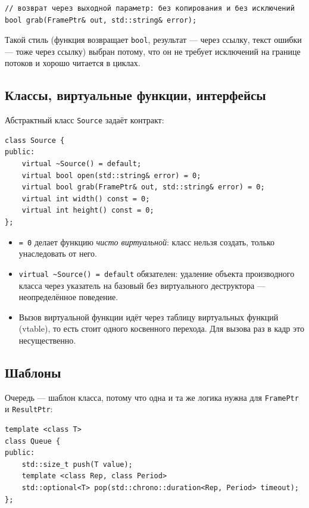 \documentclass[11pt,a4paper]{article}
\theoremstyle{definition}
\theoremstyle{remark}
\begin{document}
\begin{lstlisting}
// возврат через выходной параметр: без копирования и без исключений
bool grab(FramePtr& out, std::string& error);
\end{lstlisting}

Такой стиль (функция возвращает \texttt{bool}, результат --- через ссылку,
текст ошибки --- тоже через ссылку) выбран потому, что он не требует
исключений на границе потоков и хорошо читается в циклах.

\subsection{Классы, виртуальные функции, интерфейсы}

Абстрактный класс \texttt{Source} задаёт контракт:

\begin{lstlisting}
class Source {
public:
    virtual ~Source() = default;
    virtual bool open(std::string& error) = 0;
    virtual bool grab(FramePtr& out, std::string& error) = 0;
    virtual int width() const = 0;
    virtual int height() const = 0;
};
\end{lstlisting}

\begin{itemize}
  \item \texttt{= 0} делает функцию \emph{чисто виртуальной}: класс нельзя
        создать, только унаследовать от него.
  \item \texttt{virtual \~{}Source() = default} обязателен: удаление объекта
        производного класса через указатель на базовый без виртуального
        деструктора --- неопределённое поведение.
  \item Вызов виртуальной функции идёт через таблицу виртуальных функций
        (vtable), то есть стоит одного косвенного перехода. Для вызова раз в
        кадр это несущественно.
\end{itemize}

\subsection{Шаблоны}

Очередь --- шаблон класса, потому что одна и та же логика нужна для
\texttt{FramePtr} и \texttt{ResultPtr}:

\begin{lstlisting}
template <class T>
class Queue {
public:
    std::size_t push(T value);
    template <class Rep, class Period>
    std::optional<T> pop(std::chrono::duration<Rep, Period> timeout);
};
\end{lstlisting}
\end{document}
